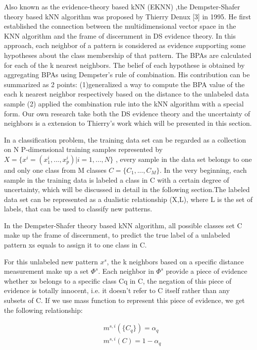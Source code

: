 \documentclass[runningheads]{llncs}
\begin{document}
Also known as the evidence-theory based kNN (EKNN) ,the Dempster-Shafer theory based kNN algorithm was proposed by Thierry Denux [3] in 1995. He first established the connection between the multidimensional vector space in the KNN algorithm and the frame of discernment in DS evidence theory. In this approach, each neighbor of a pattern is considered as evidence supporting some hypotheses about the class membership of that pattern. The BPAs are calculated for each of the k nearest neighbors. The belief of each hypothese is obtained by aggregating BPAs using Dempster’s rule of combination. His contribution can be summarized as 2 points: (1)generalized a way to compute the BPA value of  the each k nearest neighbor respectively based on the distance to the unlabeled data sample (2) applied the combination rule into the kNN algorithm with a special form. Our own research take both the DS evidence theory and the uncertainty of neighbors is a extension to Thierry's work which will be presented in this section.

In a classification problem, the training data set can be regarded as a collection on N P-dimensional training samples represented by $X=\{x^i=(x_1^i,...,x_p^i)|i=1,...,N\}$  , every sample in the data set belongs to one and only one class from M classes $C=\{C_1,...,C_M\}$. In the very beginning, each sample in the training data is labeled a class in C with a certain degree of uncertainty, which will be discussed in detail in the following section.The labeled data set can be represented as a dualistic relationship (X,L), where L is the set of labels, that can be used to classify new patterns.

In the Dempster-Shafer theory based kNN algorithm, all possible classes set C make up the frame of discernment, to predict the true label of a unlabeled pattern xs equals to assign it to one class in C.

For this unlabeled new pattern $x^s$, the k neighbors based on a specific distance measurement make up a set $\Phi^s$. Each neighbor in $\Phi^s$ provide a piece of evidence whether xs belongs to a specific class Cq in C, the negation of this piece of evidence is totally innocent, i.e. it doesn't refer to  C itself rather than any subsets of C. If we use mass function to represent this piece of evidence, we get the following relationship:

\begin{equation}
\begin{split}
&\ m^{s,i}( \{C_q\}) = \alpha_q
\\
&\ m^{s,i}(C) = 1-\alpha_q
\end{split}
\end{equation}
\end{document}
